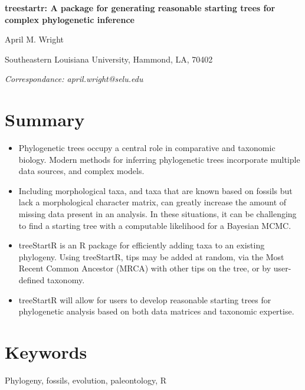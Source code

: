\documentclass[11pt]{article}
\begin{document}
\thispagestyle{plain}


\begin{center}
\textbf{\LARGE treestartr: A package for generating reasonable starting trees for complex phylogenetic inference} \\\vspace{2mm}
\vspace{1cm}

{\Large April M. Wright}\\\vspace{2mm}

Southeastern Louisiana University, Hammond, LA, 70402\\\vspace{2mm}

\textit{Correspondance: april.wright@selu.edu}

\end{center}

\pagebreak

\section{Summary}
\begin{itemize}
\item Phylogenetic trees occupy a central role in comparative and taxonomic biology. Modern methods for inferring phylogenetic trees incorporate multiple data sources, and complex models.
\item Including morphological taxa, and taxa that are known based on fossils but lack a morphological character matrix, can greatly increase the amount of missing data present in an analysis. In these situations, it can be challenging to find a starting tree with a computable likelihood for a Bayesian MCMC.
\item treeStartR is an R package for efficiently adding taxa to an existing phylogeny. 
Using treeStartR, tips may be added at random, via the Most Recent Common Ancestor (MRCA) with other tips on the tree, or by user-defined taxonomy.
\item treeStartR will allow for users to develop reasonable starting trees for phylogenetic analysis based on both data matrices and taxonomic expertise.
\end{itemize}

\section{Keywords}
Phylogeny, fossils, evolution, paleontology, R
\end{document}

